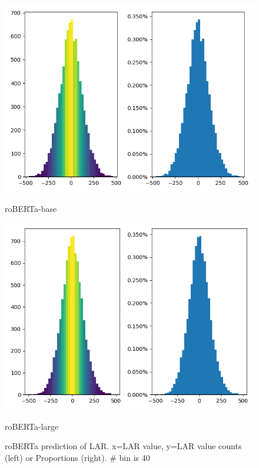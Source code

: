 \documentclass[letterpaper]{article} %
\begin{document}
\begin{figure}[!ht]
\centering
\begin{minipage}[b]{0.45\textwidth}
    \includegraphics[width=\textwidth]{SWOW_roberta_base.png}
    \caption*{roBERTa-base}
  \end{minipage}
  \hfill
  \begin{minipage}[b]{0.45\textwidth}
    \includegraphics[width=\textwidth]{SWOW_roberta_large.png}
    \caption*{roBERTa-large}
  \end{minipage}

 \caption{roBERTa prediction of LAR. x=LAR value, y=LAR value counts (left) or Proportions (right). \# bin is 40}
 \label{fig:larroberta}

\end{figure}
\end{document}
